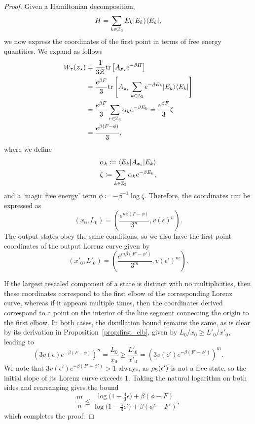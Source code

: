 \documentclass[pra,
aps,
twocolumn,
superscriptaddress,
groupedaddress,
nofootinbib,
reprint
]{revtex4-1}
\begin{document}
\begin{proof}
Given a Hamiltonian decomposition,
\begin{equation}
	H = \sum_{k \in \mathbb{Z}_3} E_k |E_k\rangle\langle E_k|,
\end{equation}
we now express the coordinates of the first point in terms of free energy quantities. We expand as follows
\begin{align}
	W_{\tau}(\bm{z}_\star) &= \frac{1}{3\mathcal{Z}}\mbox{tr}\left[ A_{\bm{z}_\star}e^{-\beta H} \right] \nonumber\\
	&= \frac{e^{\beta F}}{3} \mbox{tr}\left[ A_{\bm{z}_\star}\sum_{k \in \mathbb{Z}_3} e^{-\beta E_k} |E_k\rangle\langle E_k| \right] \nonumber\\
	&= \frac{e^{\beta F}}{3} \sum_{r \in \mathbb{Z}_3} \alpha_k e^{-\beta E_k}
	= \frac{e^{\beta F}}{3} \zeta \nonumber\\
	&= \frac{e^{\beta (F - \phi)}}{3},
\end{align}
where we define
\begin{align}
\alpha_k \coloneqq \langle E_k |A_{\bm{z}_\star} |E_k\rangle \\
\zeta \coloneqq  \sum_{k \in \mathbb{Z}_3} \alpha_k e^{-\beta E_k},
\end{align}
and a `magic free energy' term $\phi \coloneqq -\beta^{-1} \log \zeta$.
Therefore, the coordinates can be expressed as
\begin{equation}
	(x_0, L_0) = \left( \frac{e^{n\beta (F - \phi)}}{3^n}, v(\epsilon)^n \right).
\end{equation}
The output states obey the same conditions, so we also have the first point coordinates of the output Lorenz curve given by
\begin{equation}
	(x'_0, L'_0) = \left( \frac{e^{m\beta (F' - \phi')}}{3^m}, v(\epsilon')^m \right).
\end{equation}

If the largest rescaled component of a state is distinct with no multiplicities, then these coordinates correspond to the first elbow of the corresponding Lorenz curve, whereas if it appears multiple times, then the coordinates derived correspond to a point on the interior of the line segment connecting the origin to the first elbow.
In both cases, the distillation bound remains the same, as is clear by its derivation in Proposition~\ref{prop:first_elb}, given by $L_0/x_0 \geq L'_0/x'_0$, leading to
\begin{equation}
	\left( 3v(\epsilon)e^{-\beta (F - \phi)} \right)^{n} = \frac{L_0}{x_0}
	\geq \frac{L'_0}{x'_0} = \left( 3v(\epsilon')e^{-\beta (F' - \phi')} \right)^{m}.
\end{equation}
We note that $3v(\epsilon')e^{-\beta (F' - \phi')} > 1$ always, as $\rho_{\rm{S}}(\epsilon')$ is not a free state, so the initial slope of its Lorenz curve exceeds $1$.
Taking the natural logarithm on both sides and rearranging gives the bound
\begin{equation}
	\frac{m}{n} \leq \dfrac{\log \big( 1-\frac{4}{3}\epsilon \big) + \beta (\phi - F)}{\log \big( 1-\frac{4}{3}\epsilon' \big) + \beta (\phi' - F')},
\end{equation}
which completes the proof.
\end{proof}
\end{document}
